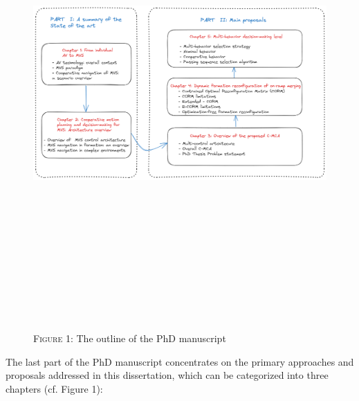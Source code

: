 \begin{figure}[!h] \label{fig:outlines}
        \centering 
        \includegraphics[width=13cm,height=18cm,keepaspectratio]{chapters/outlines}
        \textsc{Figure 1:} The outline of the PhD manuscript
        \end{figure}


The last part of the PhD manuscript concentrates on the primary approaches and proposals addressed in this dissertation, which can be categorized into three chapters (cf. Figure 1): 


